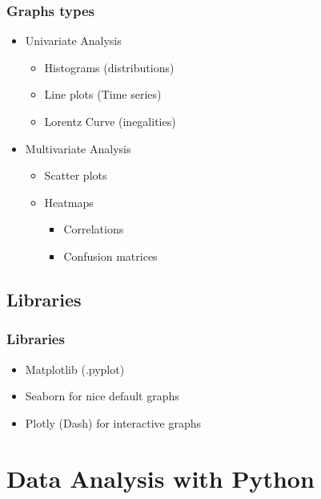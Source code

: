 \begin{frame}\frametitle{Graphs types}
   \begin{itemize}
      \item Univariate Analysis
      \begin{itemize}
         \item Histograms (distributions)
         \item Line plots (Time series)
         \item Lorentz Curve (inegalities)
      \end{itemize}
      \item Multivariate Analysis
      \begin{itemize}
         \item Scatter plots
         \item Heatmaps
         \begin{itemize}
            \item Correlations
            \item Confusion matrices
         \end{itemize}
      \end{itemize}
   \end{itemize}
\end{frame}

\subsection{Libraries}

\begin{frame}\frametitle{Libraries}
   \begin{itemize}
      \item Matplotlib (.pyplot)
      \item Seaborn for nice default graphs
      \item Plotly (Dash) for interactive graphs
   \end{itemize}
\end{frame}



\section{Data Analysis with Python}


